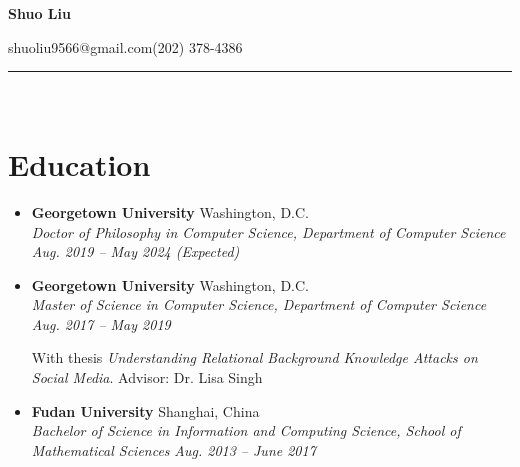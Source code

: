 \documentclass[letterpaper,11pt]{article}
\makeatletter
\newcommand{\resumeSubheading}[4]{
  \vspace{-7pt}\item
      \textbf{#1} \hfill #2 \\
      \textit{\small#3} \hfill \textit{\small #4}
  \vspace{-4pt}
}
\newcommand{\resumeSubHeadingListStart}{\begin{itemize}[leftmargin=*]}
\newcommand{\resumeSubHeadingListEnd}{\end{itemize}}
\makeatother
\begin{document}
\begin{center}
\textbf{\huge Shuo Liu}

\vspace{5pt}
shuoliu9566@gmail.com\qquad (202) 378-4386

\date{\today}

\end{center}
\vspace{-15pt}
\noindent\rule{\textwidth}{1.5pt}\\
\vspace{-5pt}

\section{Education}
  \resumeSubHeadingListStart
    \resumeSubheading
      {Georgetown University}{Washington, D.C.}
      {Doctor of Philosophy in Computer Science\emph{, Department of Computer Science}}{Aug. 2019 -- May 2024 (Expected)}
    \resumeSubheading
      {Georgetown University}{Washington, D.C.}
      {Master of Science in Computer Science\emph{, Department of Computer Science}}{Aug. 2017 -- May 2019}

      \begin{small}{With thesis \emph{Understanding Relational Background Knowledge Attacks on Social Media}. Advisor: Dr. Lisa Singh}\end{small}
    \resumeSubheading
      {Fudan University}{Shanghai, China}
      {Bachelor of Science in Information and Computing Science\emph{, School of Mathematical Sciences}}{Aug. 2013 -- June 2017}
  \resumeSubHeadingListEnd

\end{document}
